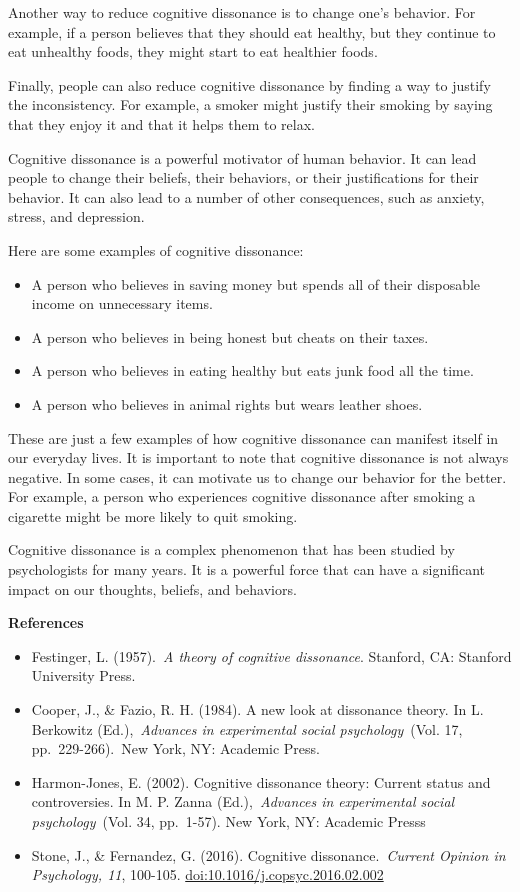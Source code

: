 \documentclass[
  b5paper]{book}
\begin{document}
Another way to reduce cognitive dissonance is to change one's behavior. For example, if a person believes that they should eat healthy, but they continue to eat unhealthy foods, they might start to eat healthier foods.

Finally, people can also reduce cognitive dissonance by finding a way to justify the inconsistency. For example, a smoker might justify their smoking by saying that they enjoy it and that it helps them to relax.

Cognitive dissonance is a powerful motivator of human behavior. It can lead people to change their beliefs, their behaviors, or their justifications for their behavior. It can also lead to a number of other consequences, such as anxiety, stress, and depression.

Here are some examples of cognitive dissonance:

\begin{itemize}
\item
  A person who believes in saving money but spends all of their disposable income on unnecessary items.
\item
  A person who believes in being honest but cheats on their taxes.
\item
  A person who believes in eating healthy but eats junk food all the time.
\item
  A person who believes in animal rights but wears leather shoes.
\end{itemize}

These are just a few examples of how cognitive dissonance can manifest itself in our everyday lives. It is important to note that cognitive dissonance is not always negative. In some cases, it can motivate us to change our behavior for the better. For example, a person who experiences cognitive dissonance after smoking a cigarette might be more likely to quit smoking.

Cognitive dissonance is a complex phenomenon that has been studied by psychologists for many years. It is a powerful force that can have a significant impact on our thoughts, beliefs, and behaviors.

\textbf{References}

\begin{itemize}
\item
  Festinger, L. (1957).~\emph{A theory of cognitive dissonance}. Stanford, CA: Stanford University Press.
\item
  Cooper, J., \& Fazio, R. H. (1984). A new look at dissonance theory. In L. Berkowitz (Ed.),~\emph{Advances in experimental social psychology}~(Vol. 17, pp.~229-266).~New York, NY: Academic Press.
\item
  Harmon-Jones, E. (2002). Cognitive dissonance theory: Current status and controversies. In M. P. Zanna (Ed.),~\emph{Advances in experimental social psychology}~(Vol. 34, pp.~1-57). New York, NY: Academic Presss
\item
  Stone, J., \& Fernandez, G. (2016). Cognitive dissonance.~\emph{Current Opinion in Psychology, 11}, 100-105. \url{doi:10.1016/j.copsyc.2016.02.002}
\end{itemize}
\end{document}
